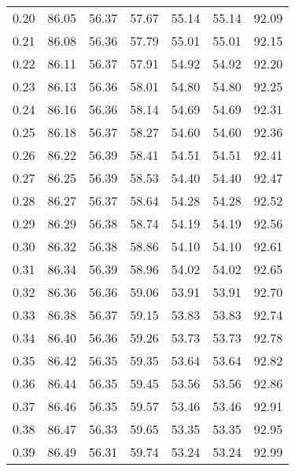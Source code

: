 \begin{tabular}{|c|c|c|c|c|c|c|}
      0.20 &     86.05 &     56.37 &      57.67 &   55.14 &      55.14 &         92.09 \\
      0.21 &     86.08 &     56.36 &      57.79 &   55.01 &      55.01 &         92.15 \\
      0.22 &     86.11 &     56.37 &      57.91 &   54.92 &      54.92 &         92.20 \\
      0.23 &     86.13 &     56.36 &      58.01 &   54.80 &      54.80 &         92.25 \\
      0.24 &     86.16 &     56.36 &      58.14 &   54.69 &      54.69 &         92.31 \\
      0.25 &     86.18 &     56.37 &      58.27 &   54.60 &      54.60 &         92.36 \\
      0.26 &     86.22 &     56.39 &      58.41 &   54.51 &      54.51 &         92.41 \\
      0.27 &     86.25 &     56.39 &      58.53 &   54.40 &      54.40 &         92.47 \\
      0.28 &     86.27 &     56.37 &      58.64 &   54.28 &      54.28 &         92.52 \\
      0.29 &     86.29 &     56.38 &      58.74 &   54.19 &      54.19 &         92.56 \\
      0.30 &     86.32 &     56.38 &      58.86 &   54.10 &      54.10 &         92.61 \\
      0.31 &     86.34 &     56.39 &      58.96 &   54.02 &      54.02 &         92.65 \\
      0.32 &     86.36 &     56.36 &      59.06 &   53.91 &      53.91 &         92.70 \\
      0.33 &     86.38 &     56.37 &      59.15 &   53.83 &      53.83 &         92.74 \\
      0.34 &     86.40 &     56.36 &      59.26 &   53.73 &      53.73 &         92.78 \\
      0.35 &     86.42 &     56.35 &      59.35 &   53.64 &      53.64 &         92.82 \\
      0.36 &     86.44 &     56.35 &      59.45 &   53.56 &      53.56 &         92.86 \\
      0.37 &     86.46 &     56.35 &      59.57 &   53.46 &      53.46 &         92.91 \\
      0.38 &     86.47 &     56.33 &      59.65 &   53.35 &      53.35 &         92.95 \\
      0.39 &     86.49 &     56.31 &      59.74 &   53.24 &      53.24 &         92.99 \\

\end{tabular}
